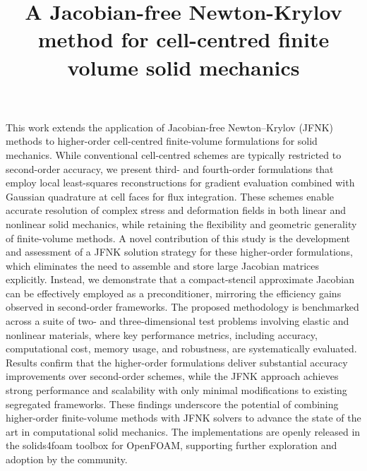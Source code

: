 \documentclass[sn-mathphys,Numbered]{sn-jnl}%
\begin{document}
\title[Article Title]{A Jacobian-free Newton-Krylov method for cell-centred finite volume solid mechanics}

\author[1,2]{ }
\author[1,3]{ }
\author*[1]{ }




\abstract
{
This work extends the application of Jacobian-free Newton–Krylov (JFNK) methods to higher-order cell-centred finite-volume formulations for solid mechanics.
While conventional cell-centred schemes are typically restricted to second-order accuracy, we present third- and fourth-order formulations that employ local least-squares reconstructions for gradient evaluation combined with Gaussian quadrature at cell faces for flux integration.
These schemes enable accurate resolution of complex stress and deformation fields in both linear and nonlinear solid mechanics, while retaining the flexibility and geometric generality of finite-volume methods.
A novel contribution of this study is the development and assessment of a JFNK solution strategy for these higher-order formulations, which eliminates the need to assemble and store large Jacobian matrices explicitly.
Instead, we demonstrate that a compact-stencil approximate Jacobian can be effectively employed as a preconditioner, mirroring the efficiency gains observed in second-order frameworks.
The proposed methodology is benchmarked across a suite of two- and three-dimensional test problems involving elastic and nonlinear materials, where key performance metrics, including accuracy, computational cost, memory usage, and robustness, are systematically evaluated.
Results confirm that the higher-order formulations deliver substantial accuracy improvements over second-order schemes, while the JFNK approach achieves strong performance and scalability with only minimal modifications to existing segregated frameworks.
These findings underscore the potential of combining higher-order finite-volume methods with JFNK solvers to advance the state of the art in computational solid mechanics.
The implementations are openly released in the solids4foam toolbox for OpenFOAM, supporting further exploration and adoption by the community.
}
\end{document}
